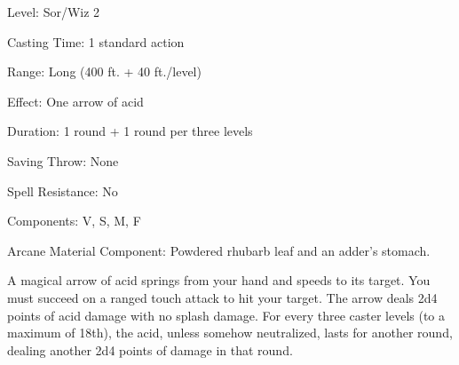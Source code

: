 
\begin{description*}
\item[Level:] Sor/Wiz 2
\item[Casting Time:] 1 standard action
\item[Range:] Long (400 ft. + 40 ft./level)
\item[Effect:] One arrow of acid
\item[Duration:] 1 round + 1 round per three levels
\item[Saving Throw:] None
\item[Spell Resistance:] No
\item[Components:] V, S, M, F
\item[Arcane Material Component:] Powdered rhubarb leaf and an adder's stomach.
\end{description*}

A magical arrow of acid springs from your hand and speeds to its target. You must
succeed on a ranged touch attack to hit your target. The arrow deals 2d4 points
of acid damage with no splash damage. For every three caster levels (to a maximum
of 18th), the acid, unless somehow neutralized, lasts for another round, dealing
another 2d4 points of damage in that round.